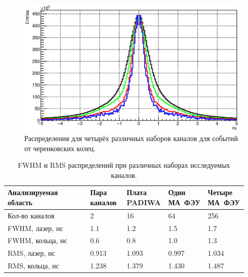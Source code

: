 \begin{figure}
\includegraphics[width=1.0\textwidth]{pictures/TimePrecision_evolution_rings.eps}
\caption{Распределения для четырёх различных наборов каналов для событий от черенковских колец.}
\label{fig:TimeResEvolutionRings}
\end{figure}

\begin{table}[h]
\caption{FWHM и RMS распределений при различных наборах исследуемых каналов.}
\label{tabl:EvolutionParams}
\begin{tabular}{ | p{0.34\linewidth} | p{0.15\linewidth} | p{0.15\linewidth} | p{0.15\linewidth} | p{0.15\linewidth} | }
	\hline
	Анализируемая область & Пара каналов & Плата PADIWA & Один МА~ФЭУ & Четыре МА~ФЭУ \\
	\hline
	Кол-во каналов & 2 & 16 & 64 & 256 \\
	\hline
	FWHM, лазер, нс & 1.1 & 1.2 & 1.5 & 1.7 \\
	\hline
	FWHM, кольца, нс & 0.6 & 0.8 & 1.0 & 1.3 \\
	\hline
	RMS, лазер, нс & 0.913 & 1.093 & 0.997 & 1.034 \\
	\hline
	RMS, кольца, нс & 1.238 & 1.379 & 1.430 & 1.487 \\
	\hline
\end{tabular}
\end{table}
